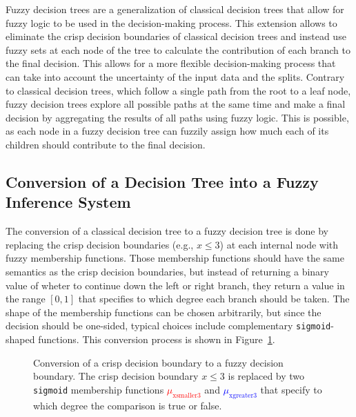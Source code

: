 Fuzzy decision trees are a generalization of classical decision trees that allow for fuzzy logic to be used in the decision-making process. This extension allows to eliminate the crisp decision boundaries of classical decision trees and instead use fuzzy sets at each node of the tree to calculate the contribution of each branch to the final decision. This allows for a more flexible decision-making process that can take into account the uncertainty of the input data and the splits. Contrary to classical decision trees, which follow a single path from the root to a leaf node, fuzzy decision trees explore all possible paths at the same time and make a final decision by aggregating the results of all paths using fuzzy logic. This is possible, as each node in a fuzzy decision tree can fuzzily assign how much each of its children should contribute to the final decision.

\subsection{Conversion of a Decision Tree into a Fuzzy Inference System}

The conversion of a classical decision tree to a fuzzy decision tree is done by replacing the crisp decision boundaries (e.g., $x \leq 3$) at each internal node with fuzzy membership functions. Those membership functions should have the same semantics as the crisp decision boundaries, but instead of returning a binary value of wheter to continue down the left or right branch, they return a value in the range $[0,1]$ that specifies to which degree each branch should be taken. The shape of the membership functions can be chosen arbitrarily, but since the decision should be one-sided, typical choices include complementary \texttt{sigmoid}-shaped functions. This conversion process is shown in Figure~\ref{fig:fuzzyMembershipFunctions}.


\begin{figure}[H]
    \centering
    \caption[Conversion of crisp tree node into fuzzy tree node]{Conversion of a crisp decision boundary to a fuzzy decision boundary. The crisp decision boundary $x \leq 3$ is replaced by two \texttt{sigmoid} membership functions \textcolor{red}{$\mu_{\text{xsmaller3}}$} and \textcolor{blue}{$\mu_{\text{xgreater3}}$} that specify to which degree the comparison is true or false.}
    \label{fig:fuzzyMembershipFunctions}
\end{figure}


